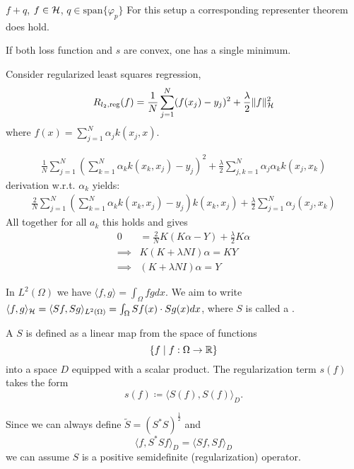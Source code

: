 \begin{remark}
    $f+q$, $f\in\mathcal{H}$, $q\in \text{span}\{\varphi_p\}$ For this setup a corresponding 
    representer theorem does hold. 
\end{remark}


\begin{remark}
    If both loss function and $s$ are convex, one has a single minimum.
\end{remark}

Consider regularized least squares regression,
\[R_{l_2,\text{reg}}(f)=\frac{1}{N}\sum_{j=1}^N (f(x_j)-y_j)^2+\frac{\lambda}{2}\Vert f\Vert_{\mathcal{H}}^2\]
where $f(x)=\sum_{j=1}^N \alpha_j k(x_j,x)$.

\begin{align*}
    \frac{1}{N}\sum_{j=1}^N\left(\sum_{k=1}^N \alpha_k k(x_k,x_j)-y_j\right)^2 +\frac{\lambda}{2}\sum_{j,k=1}^N \alpha_j\alpha_k k(x_j,x_k)
\end{align*}
derivation w.r.t. $\alpha_k$ yields:
\begin{align*}
    \frac{2}{N}\sum_{j=1}^N \left(\sum_{k=1}^N \alpha_k k(x_k,x_j)-y_j\right)k(x_k,x_j) +\frac{\lambda}{2}\sum_{j=1}^N \alpha_j(x_j,x_k)
\end{align*}
All together for all $a_k$ this holds and gives 
\begin{align*}
    0&=\frac{2}{N}K(K\alpha-Y)+\frac{\lambda}{2}K \alpha\\
    \implies & K(K+\lambda N I)\alpha = KY \\
    \implies & (K+\lambda N I)\alpha = Y
\end{align*}


In $L^2(\Omega)$ we have $\langle f,g\rangle=\int_\Omega fgdx$.
We aim to write $\langle f,g\rangle_{\mathcal{H}}=\langle Sf,Sg\rangle_{L^2(\Omega)}=\int_{\Omega}Sf(x)\cdot Sg(x)dx$,
where $S$ is called a .

\begin{definition}\label{def:47}
    A  $S$ is defined as a linear map 
    from the space of functions \[\{f\mid f:\Omega\to \mathbb{R}\}\] into 
    a space $D$ equipped with a scalar product. The regularization 
    term $s(f)$ takes the form \[s(f)\coloneqq \langle S(f),S(f)\rangle_D.\]
\end{definition}

\begin{remark}
    Since we can always define $\tilde{S}=(S^*S)^{\frac{1}{2}}$ and 
    \[\langle f, S^*S f\rangle_D=\langle Sf,Sf\rangle_D\]
    we can assume $S$ is a positive semidefinite (regularization) operator.
\end{remark}

